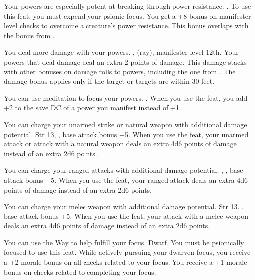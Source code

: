 {Your powers are especially potent at breaking through power resistance.}
{.}
{To use this feat, you must expend your psionic focus. You get a +8 bonus on manifester level checks to overcome a creature's power resistance. This bonus overlaps with the bonus from .}
{}{}

{You deal more damage with your powers.}
{,  (ray), manifester level 12th.}
{Your powers that deal damage deal an extra 2 points of damage. This damage stacks with other bonuses on damage rolls to powers, including the one from . The damage bonus applies only if the target or targets are within 30 feet.}
{}{}

{You can use meditation to focus your powers.}
{.}
{When you use the  feat, you add +2 to the save DC of a power you manifest instead of +1.}
{}{}

{You can charge your unarmed strike or natural weapon with additional damage potential.}
{Str 13, , base attack bonus +5.}
{When you use the  feat, your unarmed attack or attack with a natural weapon deals an extra 4d6 points of damage instead of an extra 2d6 points.}
{}{}

{You can charge your ranged attacks with additional damage potential.}
{, , base attack bonus +5.}
{When you use the  feat, your ranged attack deals an extra 4d6 points of damage instead of an extra 2d6 points.}
{}{}

{You can charge your melee weapon with additional damage potential.}
{Str 13, , base attack bonus +5.}
{When you use the  feat, your attack with a melee weapon deals an extra 4d6 points of damage instead of an extra 2d6 points.}
{}{}

{You can use the Way to help fulfill your focus.}
{Dwarf.}
{You must be psionically focused to use this feat. While actively pursuing your dwarven focus, you receive a +2 morale bonus on all checks related to your focus.}
{You receive a +1 morale bonus on checks related to completing your focus.}
{}

